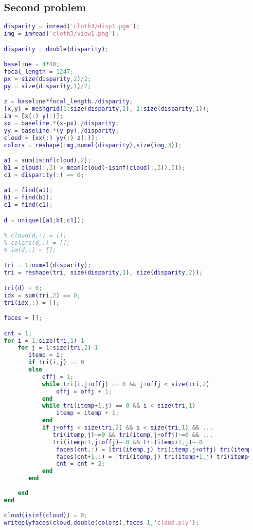 \documentclass{article}
\begin{document}
\subsection{Second problem}
\begin{lstlisting}[language=Matlab]
disparity = imread('cloth3/disp1.pgm');
img = imread('cloth3/view1.png');

disparity = double(disparity);

baseline = 4*40;
focal_length = 1247;
px = size(disparity,2)/2;
py = size(disparity,1)/2;

z = baseline*focal_length./disparity;
[x,y] = meshgrid(1:size(disparity,2), 1:size(disparity,1));
im = [x(:) y(:)];
xx = baseline.*(x-px)./disparity;
yy = baseline.*(y-py)./disparity;
cloud = [xx(:) yy(:) z(:)];
colors = reshape(img,numel(disparity),size(img,3));

a1 = sum(isinf(cloud),2);
b1 = cloud(:,3) > mean(cloud(~isinf(cloud(:,3)),3));
c1 = disparity(:) == 0;

a1 = find(a1);
b1 = find(b1);
c1 = find(c1);

d = unique([a1;b1;c1]);

% cloud(d,:) = [];
% colors(d,:) = [];
% im(d,:) = [];

tri = 1:numel(disparity);
tri = reshape(tri, size(disparity,1), size(disparity,2));

tri(d) = 0;
idx = sum(tri,2) == 0;
tri(idx,:) = [];

faces = [];

cnt = 1;
for i = 1:size(tri,1)-1
    for j = 1:size(tri,2)-1
       itemp = i;
       if tri(i,j) == 0
       else
           offj = 1;
           while tri(i,j+offj) == 0 && j+offj < size(tri,2)
               offj = offj + 1; 
           end
           while tri(itemp+1,j) == 0 && i < size(tri,1)
               itemp = itemp + 1;
           end
           if j+offj < size(tri,2) && i < size(tri,1) && ...
              tri(itemp,j)~=0 && tri(itemp,j+offj)~=0 && ...
              tri(itemp+1,j+offj)~=0 && tri(itemp+1,j)~=0
               faces(cnt,:) = [tri(itemp,j) tri(itemp,j+offj) tri(itemp+1,j+offj)];
               faces(cnt+1,:) = [tri(itemp,j) tri(itemp+1,j) tri(itemp+1,j+offj)];
               cnt = cnt + 2;
           end
       end
       
    end
end

cloud(isinf(cloud)) = 0;
writeplyfaces(cloud,double(colors),faces-1,'cloud.ply');
\end{lstlisting}
\end{document}
